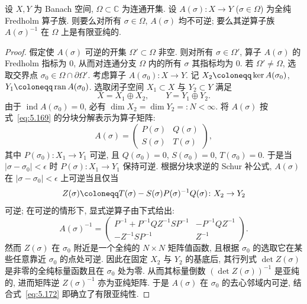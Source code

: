 \begin{theorem}[解析 Fredholm 定理]\label{thm:5.77}
设 $X, Y$ 为 Banach 空间, $\Omega \subset \mathbb{C}$ 为连通开集. 设 $A(\sigma) \colon X \to Y$ ($\sigma \in \Omega$) 为全纯 Fredholm 算子族. 则要么对所有 $\sigma \in \Omega$, $A(\sigma)$ 均不可逆; 要么其逆算子族 $A(\sigma)^{-1}$ 在 $\Omega$ 上是有限亚纯的.
\end{theorem}

\begin{proof}
假定使 $A(\sigma)$ 可逆的开集 $\Omega' \subset \Omega$ 非空. 则对所有 $\sigma \in \Omega'$, 算子 $A(\sigma)$ 的 Fredholm 指标为 0, 从而对连通分支 $\Omega$ 内的所有 $\sigma$ 其指标均为 0. 若 $\Omega' \neq \Omega$, 选取交界点 $\sigma_0 \in \Omega \cap \partial\Omega'$. 考虑算子 $A(\sigma_0) \colon X \to Y$. 记 $X_2 \defeq \ker A(\sigma_0)$, $Y_1 \defeq \ran A(\sigma_0)$. 选取闭子空间 $X_1 \subset X$ 与 $Y_2 \subset Y$ 满足
\begin{equation}\label{eq:5.169}
    X = X_1 \oplus X_2, \qquad Y = Y_1 \oplus Y_2.
\end{equation}
由于 $\operatorname{ind} A(\sigma_0) = 0$, 必有 $\dim X_2 = \dim Y_2 =: N < \infty$. 将 $A(\sigma)$ 按式~\eqref{eq:5.169} 的分块分解表示为算子矩阵:
\begin{equation}\label{eq:5.170}
    A(\sigma) = \begin{pmatrix} P(\sigma) & Q(\sigma) \\ S(\sigma) & T(\sigma) \end{pmatrix},
\end{equation}
其中 $P(\sigma_0) \colon X_1 \to Y_1$ 可逆, 且 $Q(\sigma_0) = 0$, $S(\sigma_0) = 0$, $T(\sigma_0) = 0$. 于是当 $|\sigma - \sigma_0| < \epsilon$ 时 $P(\sigma) \colon X_1 \to Y_1$ 保持可逆. 根据分块求逆的 Schur 补公式, $A(\sigma)$ 在 $|\sigma - \sigma_0| < \epsilon$ 上可逆当且仅当
\begin{equation}\label{eq:5.171}
    Z(\sigma) \defeq T(\sigma) - S(\sigma) P(\sigma)^{-1} Q(\sigma) \colon X_2 \to Y_2
\end{equation}
可逆; 在可逆的情形下, 显式逆算子由下式给出:
\begin{equation}\label{eq:5.172}
    A(\sigma)^{-1} = \begin{pmatrix} P^{-1} + P^{-1} Q Z^{-1} S P^{-1} & -P^{-1} Q Z^{-1} \\ -Z^{-1} S P^{-1} & Z^{-1} \end{pmatrix}.
\end{equation}
然而 $Z(\sigma)$ 在 $\sigma_0$ 附近是一个全纯的 $N \times N$ 矩阵值函数, 且根据 $\sigma_0$ 的选取它在某些任意靠近 $\sigma_0$ 的点处可逆. 因此在固定 $X_2$ 与 $Y_2$ 的基底后, 其行列式 $\det Z(\sigma)$ 是非零的全纯标量函数且在 $\sigma_0$ 处为零. 从而其标量倒数 $(\det Z(\sigma))^{-1}$ 是亚纯的, 进而矩阵逆 $Z(\sigma)^{-1}$ 亦为亚纯矩阵. 于是 $A(\sigma)$ 在 $\sigma_0$ 的去心邻域内可逆, 结合式~\eqref{eq:5.172} 即确立了有限亚纯性.
\end{proof}

